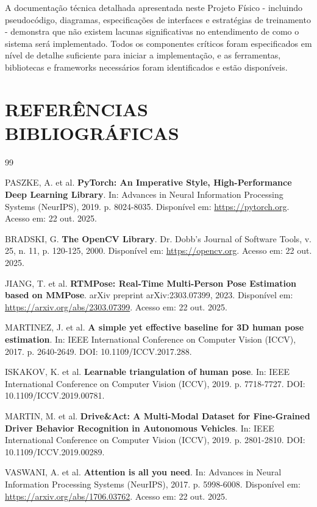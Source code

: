 \documentclass[12pt, a4paper]{article}
\begin{document}
A documentação técnica detalhada apresentada neste Projeto Físico - incluindo pseudocódigo, diagramas, especificações de interfaces e estratégias de treinamento - demonstra que não existem lacunas significativas no entendimento de como o sistema será implementado. Todos os componentes críticos foram especificados em nível de detalhe suficiente para iniciar a implementação, e as ferramentas, bibliotecas e frameworks necessários foram identificados e estão disponíveis.

\section{REFERÊNCIAS BIBLIOGRÁFICAS}

\begin{thebibliography}{99}

PASZKE, A. et al. \textbf{PyTorch: An Imperative Style, High-Performance Deep Learning Library}. In: Advances in Neural Information Processing Systems (NeurIPS), 2019. p. 8024-8035. Disponível em: \url{https://pytorch.org}. Acesso em: 22 out. 2025.

BRADSKI, G. \textbf{The OpenCV Library}. Dr. Dobb's Journal of Software Tools, v. 25, n. 11, p. 120-125, 2000. Disponível em: \url{https://opencv.org}. Acesso em: 22 out. 2025.

JIANG, T. et al. \textbf{RTMPose: Real-Time Multi-Person Pose Estimation based on MMPose}. arXiv preprint arXiv:2303.07399, 2023. Disponível em: \url{https://arxiv.org/abs/2303.07399}. Acesso em: 22 out. 2025.

MARTINEZ, J. et al. \textbf{A simple yet effective baseline for 3D human pose estimation}. In: IEEE International Conference on Computer Vision (ICCV), 2017. p. 2640-2649. DOI: 10.1109/ICCV.2017.288.

ISKAKOV, K. et al. \textbf{Learnable triangulation of human pose}. In: IEEE International Conference on Computer Vision (ICCV), 2019. p. 7718-7727. DOI: 10.1109/ICCV.2019.00781.

MARTIN, M. et al. \textbf{Drive\&Act: A Multi-Modal Dataset for Fine-Grained Driver Behavior Recognition in Autonomous Vehicles}. In: IEEE International Conference on Computer Vision (ICCV), 2019. p. 2801-2810. DOI: 10.1109/ICCV.2019.00289.

VASWANI, A. et al. \textbf{Attention is all you need}. In: Advances in Neural Information Processing Systems (NeurIPS), 2017. p. 5998-6008. Disponível em: \url{https://arxiv.org/abs/1706.03762}. Acesso em: 22 out. 2025.


\end{thebibliography}
\end{document}
